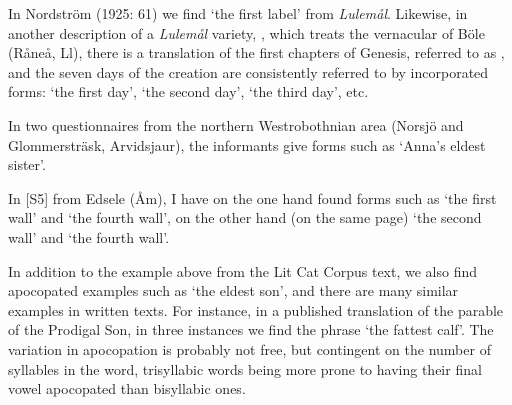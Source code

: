 
In Nordström (1925: 61) we find  ‘the first label’ from \textit{Lulemål}. Likewise, in another description of a \textit{Lulemål} variety, \citet{Wikberg2004}, which treats the vernacular of Böle (Råneå, Ll), there is a translation of the first chapters of Genesis, referred to as , and the seven days of the creation are consistently referred to by incorporated forms:  ‘the first day’,  ‘the second day’,  ‘the third day’, etc. 


In two questionnaires from the northern Westrobothnian area (Norsjö and Glommersträsk, Arvidsjaur), the informants give forms such as  ‘Anna’s eldest sister’.


In [S5] from Edsele (Åm), I have on the one hand found forms such as  ‘the first wall’ and ‘the fourth wall’, on the other hand (on the same page)  ‘the second wall’ and ‘the fourth wall’.


In addition to the example above from the Lit Cat Corpus text, we also find apocopated examples such as  ‘the eldest son’, and there are many similar examples in written texts. For instance, in a published translation of the parable of the Prodigal Son, in three instances we find the phrase  ‘the fattest calf’. The variation in apocopation is probably not free, but contingent on the number of syllables in the word, trisyllabic words being more prone to having their final vowel apocopated than bisyllabic ones. 

